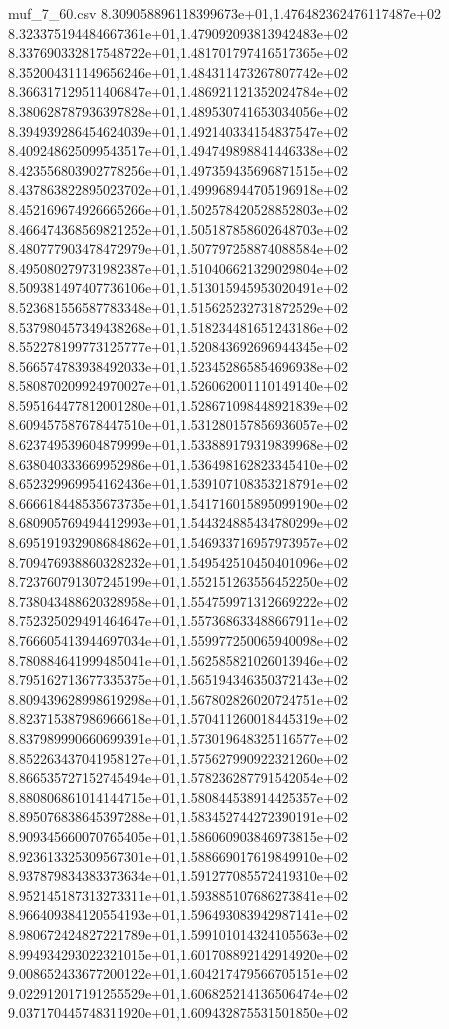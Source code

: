 \begin{filecontents*}{muf_7_60.csv}
8.309058896118399673e+01,1.476482362476117487e+02
8.323375194484667361e+01,1.479092093813942483e+02
8.337690332817548722e+01,1.481701797416517365e+02
8.352004311149656246e+01,1.484311473267807742e+02
8.366317129511406847e+01,1.486921121352024784e+02
8.380628787936397828e+01,1.489530741653034056e+02
8.394939286454624039e+01,1.492140334154837547e+02
8.409248625099543517e+01,1.494749898841446338e+02
8.423556803902778256e+01,1.497359435696871515e+02
8.437863822895023702e+01,1.499968944705196918e+02
8.452169674926665266e+01,1.502578420528852803e+02
8.466474368569821252e+01,1.505187858602648703e+02
8.480777903478472979e+01,1.507797258874088584e+02
8.495080279731982387e+01,1.510406621329029804e+02
8.509381497407736106e+01,1.513015945953020491e+02
8.523681556587783348e+01,1.515625232731872529e+02
8.537980457349438268e+01,1.518234481651243186e+02
8.552278199773125777e+01,1.520843692696944345e+02
8.566574783938492033e+01,1.523452865854696938e+02
8.580870209924970027e+01,1.526062001110149140e+02
8.595164477812001280e+01,1.528671098448921839e+02
8.609457587678447510e+01,1.531280157856936057e+02
8.623749539604879999e+01,1.533889179319839968e+02
8.638040333669952986e+01,1.536498162823345410e+02
8.652329969954162436e+01,1.539107108353218791e+02
8.666618448535673735e+01,1.541716015895099190e+02
8.680905769494412993e+01,1.544324885434780299e+02
8.695191932908684862e+01,1.546933716957973957e+02
8.709476938860328232e+01,1.549542510450401096e+02
8.723760791307245199e+01,1.552151263556452250e+02
8.738043488620328958e+01,1.554759971312669222e+02
8.752325029491464647e+01,1.557368633488667911e+02
8.766605413944697034e+01,1.559977250065940098e+02
8.780884641999485041e+01,1.562585821026013946e+02
8.795162713677335375e+01,1.565194346350372143e+02
8.809439628998619298e+01,1.567802826020724751e+02
8.823715387986966618e+01,1.570411260018445319e+02
8.837989990660699391e+01,1.573019648325116577e+02
8.852263437041958127e+01,1.575627990922321260e+02
8.866535727152745494e+01,1.578236287791542054e+02
8.880806861014144715e+01,1.580844538914425357e+02
8.895076838645397288e+01,1.583452744272390191e+02
8.909345660070765405e+01,1.586060903846973815e+02
8.923613325309567301e+01,1.588669017619849910e+02
8.937879834383373634e+01,1.591277085572419310e+02
8.952145187313273311e+01,1.593885107686273841e+02
8.966409384120554193e+01,1.596493083942987141e+02
8.980672424827221789e+01,1.599101014324105563e+02
8.994934293022321015e+01,1.601708892142914920e+02
9.008652433677200122e+01,1.604217479566705151e+02
9.022912017191255529e+01,1.606825214136506474e+02
9.037170445748311920e+01,1.609432875531501850e+02

\end{filecontents*}
